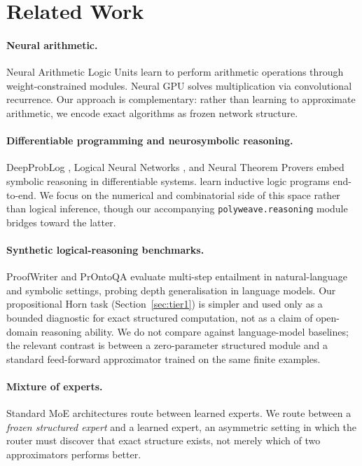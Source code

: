 \documentclass{article}
\begin{document}
\section{Related Work}
\label{sec:related}

\paragraph{Neural arithmetic.}
Neural Arithmetic Logic Units \citep{nalu2018} learn to perform arithmetic operations
through weight-constrained modules. Neural GPU \citep{neuralgpu2015} solves
multiplication via convolutional recurrence. Our approach is complementary: rather than
learning to approximate arithmetic, we encode exact algorithms as frozen network
structure.

\paragraph{Differentiable programming and neurosymbolic reasoning.}
DeepProbLog \citep{deepproblog2018}, Logical Neural Networks \citep{lnn2020}, and
Neural Theorem Provers \citep{ntp2017} embed symbolic reasoning in differentiable
systems. \citet{differentiableILP2017} learn inductive logic programs end-to-end. We
focus on the numerical and combinatorial side of this space rather than logical
inference, though our accompanying \texttt{polyweave.reasoning} module bridges toward
the latter.

\paragraph{Synthetic logical-reasoning benchmarks.}
ProofWriter \citep{proofwriter2021} and PrOntoQA \citep{prontoqa2023} evaluate
multi-step entailment in natural-language and symbolic settings, probing depth
generalisation in language models. Our propositional Horn task (Section~\ref{sec:tier1})
is simpler and used only as a bounded diagnostic for exact structured computation, not
as a claim of open-domain reasoning ability. We do not compare against language-model
baselines; the relevant contrast is between a zero-parameter structured module and a
standard feed-forward approximator trained on the same finite examples.

\paragraph{Mixture of experts.}
Standard MoE architectures \citep{moe2017,switch2022} route between learned experts.
We route between a \emph{frozen structured expert} and a learned expert, an asymmetric
setting in which the router must discover that exact structure exists, not merely which
of two approximators performs better.
\end{document}
